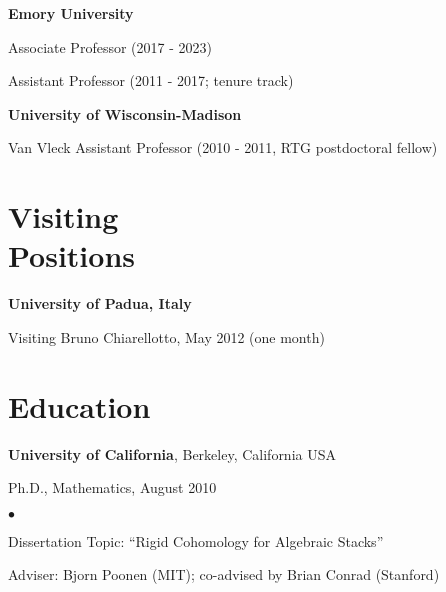 \documentclass[margin,line]{res}
\newenvironment{list1}{
  \begin{list}{\ding{113}}{%
      \setlength{\itemsep}{0in}
      \setlength{\parsep}{0in} \setlength{\parskip}{0in}
      \setlength{\topsep}{0in} \setlength{\partopsep}{0in}
      \setlength{\leftmargin}{0.17in}}}{\end{list}}
\newenvironment{list2}{
  \begin{list}{$\bullet$}{%
      \setlength{\itemsep}{0in}
      \setlength{\parsep}{0in} \setlength{\parskip}{0in}
      \setlength{\topsep}{0in} \setlength{\partopsep}{0in}
      \setlength{\leftmargin}{0.2in}}}{\end{list}}
\begin{document}
\begin{resume}
{\bf Emory University } \\
  \vspace*{-.15in}
  \begin{list1}
  \item[] Associate Professor (2017 - 2023)
  \item[] Assistant Professor (2011 - 2017; tenure track)


  \end{list1}
\vspace{-7pt}

{\bf University of Wisconsin-Madison } \\
  \vspace*{-.15in}
  \begin{list1}
  \item[] Van Vleck Assistant Professor (2010 - 2011, RTG postdoctoral fellow)

  \end{list1}

\section{\sc Visiting \\ Positions}
{\bf University of Padua, Italy}\\
  \vspace*{-.15in}
  \begin{list1}
  \item[]  Visiting Bruno Chiarellotto, May 2012 (one month)
  \end{list1}

\section{\sc Education}
{\bf University of California}, Berkeley, California USA\\
  \vspace*{-.15in}
  \begin{list1}
  \item[] Ph.D., Mathematics, August 2010
    \begin{list2}
      \vspace*{.00in}
    \item [] Dissertation Topic: ``Rigid Cohomology for Algebraic Stacks''
    \item [] Adviser: Bjorn Poonen (MIT); co-advised by Brian Conrad (Stanford)
    \end{list2}
  \end{list1}
\vspace{-7pt}


\end{resume}
\end{document}
